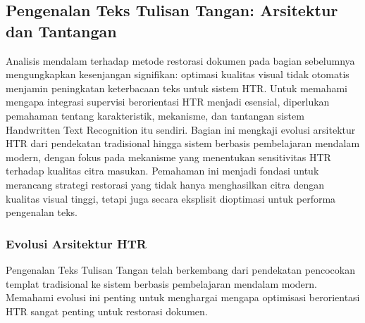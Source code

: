 \documentclass[12pt,a4paper]{article}
\begin{document}
\subsection{Pengenalan Teks Tulisan Tangan: Arsitektur dan Tantangan}
\label{subsec:htr-systems}

Analisis mendalam terhadap metode restorasi dokumen pada bagian sebelumnya mengungkapkan kesenjangan signifikan: optimasi kualitas visual tidak otomatis menjamin peningkatan keterbacaan teks untuk sistem HTR. Untuk memahami mengapa integrasi supervisi berorientasi HTR menjadi esensial, diperlukan pemahaman tentang karakteristik, mekanisme, dan tantangan sistem Handwritten Text Recognition itu sendiri. Bagian ini mengkaji evolusi arsitektur HTR dari pendekatan tradisional hingga sistem berbasis pembelajaran mendalam modern, dengan fokus pada mekanisme yang menentukan sensitivitas HTR terhadap kualitas citra masukan. Pemahaman ini menjadi fondasi untuk merancang strategi restorasi yang tidak hanya menghasilkan citra dengan kualitas visual tinggi, tetapi juga secara eksplisit dioptimasi untuk performa pengenalan teks.

\subsubsection{Evolusi Arsitektur HTR}
\label{subsubsec:htr-evolution}

Pengenalan Teks Tulisan Tangan telah berkembang dari pendekatan pencocokan templat tradisional ke sistem berbasis pembelajaran mendalam modern. Memahami evolusi ini penting untuk menghargai mengapa optimisasi berorientasi HTR sangat penting untuk restorasi dokumen.
\end{document}
